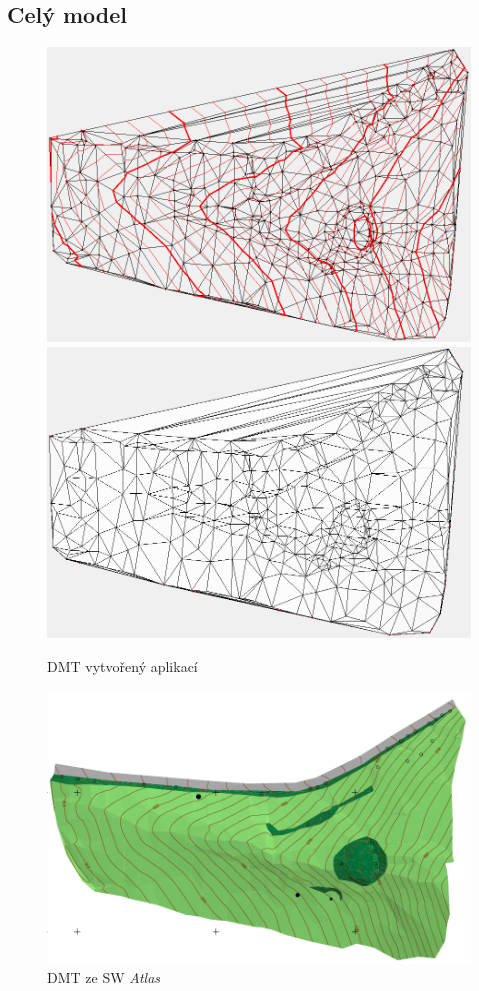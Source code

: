 \documentclass[a4paper, 12pt]{article}
\begin{document}
\subsection{Celý model}
\begin{figure}[h!]
	\centering
	\includegraphics[width=12cm]{./pictures/kupec_dtm_contours.png}
	\includegraphics[width=12cm]{./pictures/kupec_dtm_slope.png}
	\caption{DMT vytvořený aplikací}
\end{figure}
\clearpage

\begin{figure}[h!]
	\centering
	\includegraphics[width=13cm]{./pictures/atlas_dtm.png}
	\caption{DMT ze SW \textit{Atlas}}
\end{figure}
\end{document}
